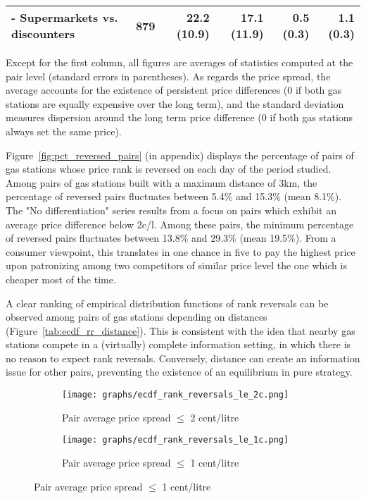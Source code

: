 \documentclass[english]{article}
\begin{document}
\begin{table}
\begin{threeparttable}
\begin{tabular}{lrrrrr}
    \hspace*{4mm} - Supermarkets vs. discounters & 879   & 22.2 (10.9) & 17.1 (11.9) & 0.5 (0.3) & 1.1 (0.3) \\
    \bottomrule
    \bottomrule
\end{tabular}
\begin{tablenotes}
			\small
      \item Except for the first column, all figures are averages of statistics computed at the pair level (standard errors in parentheses). As regards the price spread, the average accounts for the existence of persistent price differences (0 if both gas stations are equally expensive over the long term), and the standard deviation measures dispersion around the long term price difference (0 if both gas stations always set the same price).
\end{tablenotes}
\end{threeparttable}
\end{table}

Figure~\ref{fig:pct_reversed_pairs} (in appendix) displays the percentage of pairs of gas stations whose price rank is reversed on each day of the period studied. Among pairs of gas stations built with a maximum distance of 3km, the percentage of reversed pairs fluctuates between 5.4\% and 15.3\%  (mean 8.1\%). The "No differentiation" series results from a focus on pairs which exhibit an average price difference below 2c/l. Among these pairs, the minimum percentage of reversed pairs fluctuates between 13.8\% and 29.3\% (mean 19.5\%). From a consumer viewpoint, this translates in one chance in five to pay the highest price upon patronizing among two competitors of similar price level the one which is cheaper most of the time.

A clear ranking of empirical distribution functions of rank reversals can be observed among pairs of gas stations depending on distances (Figure~\ref{tab:ecdf_rr_distance}). This is consistent with the idea that nearby gas stations compete in a (virtually) complete information setting, in which there is no reason to expect rank reversals. Conversely, distance can create an information issue for other pairs, preventing the existence of an equilibrium in pure strategy.

\begin{figure}[H]
\centering
\caption{Empirical distribution functions of rank reversals}
\label{tab:ecdf_rr_distance}
\begin{subfigure}{.49\textwidth}
\centering
\texttt{[image: graphs/ecdf\_rank\_reversals\_le\_2c.png]}
\caption[short]{Pair average price spread $\le$ 2 cent/litre}
\end{subfigure}
\begin{subfigure}{.49\textwidth}
\centering
\texttt{[image: graphs/ecdf\_rank\_reversals\_le\_1c.png]}
\caption[short]{Pair average price spread $\le$ 1 cent/litre}
\end{subfigure}
\end{figure}
\end{document}

